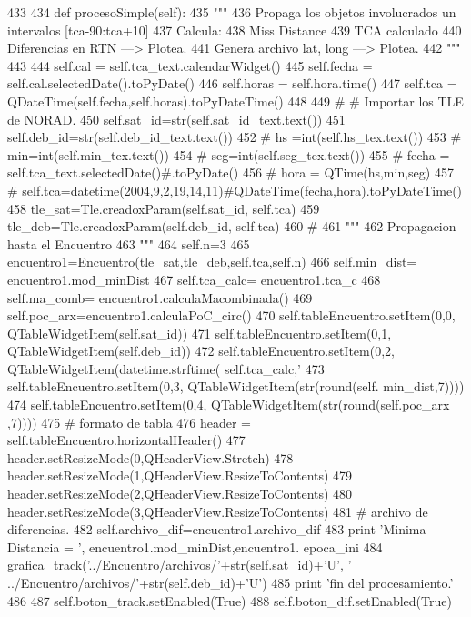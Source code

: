 \begin{DoxyCode}
433 
434     def procesoSimple(self):
435         """
436         Propaga los objetos involucrados un intervalos [tca-90:tca+10]
437         Calcula:
438             Miss Distance
439             TCA calculado
440             Diferencias en RTN ---> Plotea.
441             Genera archivo lat, long ---> Plotea.          
442         """
443 
444         self.cal = self.tca_text.calendarWidget()
445         self.fecha = self.cal.selectedDate().toPyDate()
446         self.horas = self.hora.time()
447         self.tca = QDateTime(self.fecha,self.horas).toPyDateTime()
448 
449 #         # Importar los TLE de NORAD.    
450         self.sat_id=str(self.sat_id_text.text())
451         self.deb_id=str(self.deb_id_text.text())
452 #         hs =int(self.hs_tex.text())
453 #         min=int(self.min_tex.text())
454 #         seg=int(self.seg_tex.text())
455 #         fecha = self.tca_text.selectedDate()#.toPyDate()
456 #         hora = QTime(hs,min,seg)
457 #       
       self.tca=datetime(2004,9,2,19,14,11)#QDateTime(fecha,hora).toPyDateTime()
458         tle_sat=Tle.creadoxParam(self.sat_id, self.tca)
459         tle_deb=Tle.creadoxParam(self.deb_id, self.tca)
460 #         
461         """
462         Propagacion hasta el Encuentro
463         """
464         self.n=3
465         encuentro1=Encuentro(tle_sat,tle_deb,self.tca,self.n)
466         self.min_dist= encuentro1.mod_minDist
467         self.tca_calc= encuentro1.tca_c
468         self.ma_comb= encuentro1.calculaMacombinada()
469         self.poc_arx=encuentro1.calculaPoC_circ()
470         self.tableEncuentro.setItem(0,0, QTableWidgetItem(self.sat_id))
471         self.tableEncuentro.setItem(0,1, QTableWidgetItem(self.deb_id))
472         self.tableEncuentro.setItem(0,2, QTableWidgetItem(datetime.strftime(
      self.tca_calc,'%
473         self.tableEncuentro.setItem(0,3, QTableWidgetItem(str(round(self.
      min_dist,7))))
474         self.tableEncuentro.setItem(0,4, QTableWidgetItem(str(round(self.poc_arx
      ,7))))
475         # formato de tabla
476         header = self.tableEncuentro.horizontalHeader()
477         header.setResizeMode(0,QHeaderView.Stretch)
478         header.setResizeMode(1,QHeaderView.ResizeToContents)
479         header.setResizeMode(2,QHeaderView.ResizeToContents)
480         header.setResizeMode(3,QHeaderView.ResizeToContents)
481         # archivo de diferencias.
482         self.archivo_dif=encuentro1.archivo_dif
483         print 'Minima Distancia = ', encuentro1.mod_minDist,encuentro1.
      epoca_ini
484         grafica_track('../Encuentro/archivos/'+str(self.sat_id)+'U', '
      ../Encuentro/archivos/'+str(self.deb_id)+'U')
485         print 'fin del procesamiento.'
486        
487         self.boton_track.setEnabled(True)
488         self.boton_dif.setEnabled(True)
    
\end{DoxyCode}
